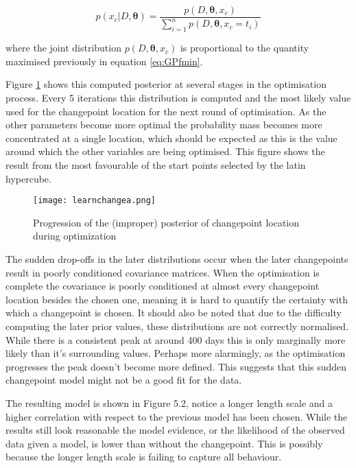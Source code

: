 \documentclass[a4paper,11pt]{report}
\begin{document}
\begin{equation} \label{eq:xcposterior}
p(x_c | D, \boldsymbol{\theta}) = \frac{p(D,\boldsymbol{\theta},x_c)} {\displaystyle \sum_{i=1}^{n} p(D,\boldsymbol{\theta},x_c = t_i)}
\end{equation}

where the joint distribution \(p(D,\boldsymbol{\theta},x_c)\) is proportional to the quantity maximised previously in equation \ref{eq:GPfmin}.

Figure \ref{fig:oscpvariation} shows this computed posterior at several stages in the optimisation process. Every 5 iterations this distribution is computed and the most likely value used for the changepoint location for the next round of optimisation. As the other parameters become more optimal the probability mass becomes more concentrated at a single location, which should be expected as this is the value around which the other variables are being optimised. This figure shows the result from the most favourable of the start points selected by the latin hypercube.

\begin{figure}
\centering
\texttt{[image: learnchangea.png]}
\caption{Progression of the (improper) posterior of changepoint location during optimization}
\label{fig:oscpvariation}
\end{figure}

The sudden drop-offs in the later distributions occur when the later changepoints result in poorly conditioned covariance matrices. When the optimisation is complete the covariance is poorly conditioned at almost every changepoint location besides the chosen one, meaning it is hard to quantify the certainty with which a changepoint is chosen. It should also be noted that due to the difficulty computing the later prior values, these distributions are not correctly normalised. \\

While there is a consistent peak at around 400 days this is only marginally more likely than it's surrounding values. Perhaps more alarmingly, as the optimisation progresses the peak doesn't become more defined. This suggests that this sudden changepoint model might not be a good fit for the data.

The resulting model is shown in Figure 5.2, notice a longer length scale and a higher correlation with respect to the previous model has been chosen. While the results still look reasonable the model evidence, or the likelihood of the observed data given a model, is lower than without the changepoint. This is possibly because the longer length scale is failing to capture all behaviour. 
\end{document}
